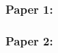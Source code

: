 \documentclass[compress]{beamer}
\begin{document}
\begin{frame}
  \frametitle{Paper 1:}
%
%
%
%
%
\end{frame}


\begin{frame}
  \frametitle{Paper 2:}

%
%
%


\end{frame}
\end{document}

